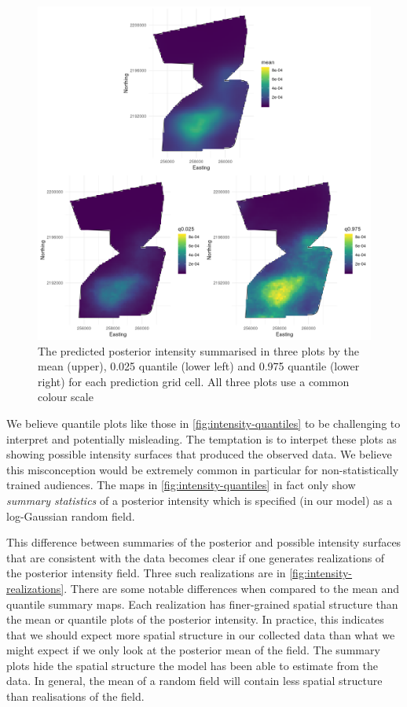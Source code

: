 \documentclass[preprint,12pt]{elsarticle}
\begin{document}
\begin{figure}
	\includegraphics[scale=0.5]{figures/intensity_quantiles.png}
	\caption{The predicted posterior intensity summarised in three plots by the mean (upper),  0.025 quantile (lower left) and 0.975 quantile (lower right) for each prediction grid cell.  All three plots use a common colour scale}
	\label{fig:intensity-quantiles}
\end{figure}

We believe quantile plots like those in \autoref{fig:intensity-quantiles} to be challenging to interpret and potentially misleading.  The temptation is to interpet these plots as showing possible intensity surfaces that produced the observed data.  We believe this misconception would be extremely common in particular for non-statistically trained audiences. The maps in \autoref{fig:intensity-quantiles} in fact only show \textit{summary statistics} of a posterior intensity which is specified (in our model) as a log-Gaussian random field.

This difference between summaries of the posterior and possible intensity surfaces that are consistent with the data becomes clear if one generates realizations of the posterior intensity field.  Three such realizations are in \autoref{fig:intensity-realizations}.  There are some notable differences when compared to the mean and quantile summary maps.  Each realization has finer-grained spatial structure than the mean or quantile plots of the posterior intensity.  In practice, this indicates that we should expect more spatial structure in our collected data than what we might expect if we only look at the posterior mean of the field.  The summary plots hide the spatial structure the model has been able to estimate from the data.  In general, the mean of a random field will contain less spatial structure than realisations of the field.
\end{document}

